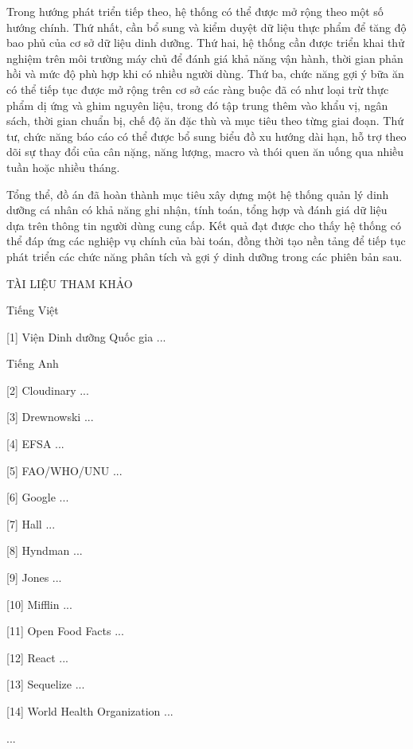 Trong hướng phát triển tiếp theo, hệ thống có thể được mở rộng theo một số hướng chính. Thứ nhất, cần bổ sung và kiểm duyệt dữ liệu thực phẩm để tăng độ bao phủ của cơ sở dữ liệu dinh dưỡng. Thứ hai, hệ thống cần được triển khai thử nghiệm trên môi trường máy chủ để đánh giá khả năng vận hành, thời gian phản hồi và mức độ phù hợp khi có nhiều người dùng. Thứ ba, chức năng gợi ý bữa ăn có thể tiếp tục được mở rộng trên cơ sở các ràng buộc đã có như loại trừ thực phẩm dị ứng và ghim nguyên liệu, trong đó tập trung thêm vào khẩu vị, ngân sách, thời gian chuẩn bị, chế độ ăn đặc thù và mục tiêu theo từng giai đoạn. Thứ tư, chức năng báo cáo có thể được bổ sung biểu đồ xu hướng dài hạn, hỗ trợ theo dõi sự thay đổi của cân nặng, năng lượng, macro và thói quen ăn uống qua nhiều tuần hoặc nhiều tháng.

Tổng thể, đồ án đã hoàn thành mục tiêu xây dựng một hệ thống quản lý dinh dưỡng cá nhân có khả năng ghi nhận, tính toán, tổng hợp và đánh giá dữ liệu dựa trên thông tin người dùng cung cấp. Kết quả đạt được cho thấy hệ thống có thể đáp ứng các nghiệp vụ chính của bài toán, đồng thời tạo nền tảng để tiếp tục phát triển các chức năng phân tích và gợi ý dinh dưỡng trong các phiên bản sau.

TÀI LIỆU THAM KHẢO

Tiếng Việt

[1] Viện Dinh dưỡng Quốc gia ...

Tiếng Anh

[2] Cloudinary ...

[3] Drewnowski ...

[4] EFSA ...

[5] FAO/WHO/UNU ...

[6] Google ...

[7] Hall ...

[8] Hyndman ...

[9] Jones ...

[10] Mifflin ...

[11] Open Food Facts ...

[12] React ...

[13] Sequelize ...

[14] World Health Organization ...

...

